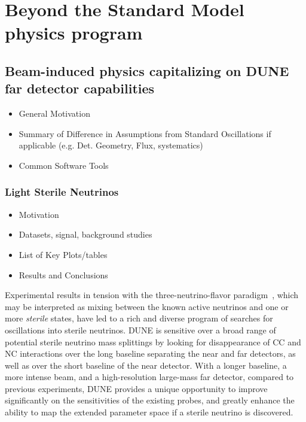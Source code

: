 \chapter{Beyond the Standard Model physics program }
\label{ch:bsm}

\section{Beam-induced physics capitalizing on DUNE far detector capabilities}\label{sec:bsm-beam}

\begin{itemize}
\item General Motivation
\item Summary of Difference in Assumptions from Standard Oscillations if applicable (e.g. Det. Geometry, Flux, systematics)
\item Common Software Tools
\end{itemize}

\subsection{Light Sterile Neutrinos}
\begin{itemize}
\item Motivation
\item Datasets, signal, background studies
\item List of Key Plots/tables
\item Results and Conclusions
\end{itemize}
Experimental results in tension with the three-neutrino-flavor paradigm~\cite{LSNDSterile,MiniBooNESterile,GalliumSummary,ReactorSummary}, which may be interpreted as mixing between the known active neutrinos and one or more {\it sterile} states, have led to a rich and diverse program of searches for oscillations into sterile neutrinos.
DUNE is sensitive over a broad range of potential sterile neutrino mass splittings by looking for disappearance of CC and NC interactions over the long baseline separating the near and far detectors, as well as over the short baseline of the near detector. 
With a longer baseline, a more intense beam, and a high-resolution large-mass far detector, compared to previous experiments, DUNE provides a unique opportunity to improve significantly on the sensitivities of the existing probes, and greatly enhance the ability to map the extended parameter space if a sterile neutrino is discovered.

